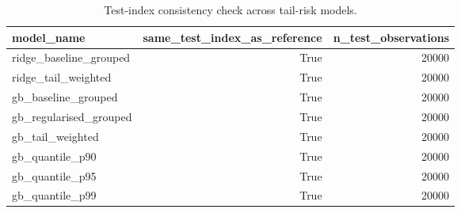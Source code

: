 \begin{table}
\caption{Test-index consistency check across tail-risk models.}
\label{tab:08-test-index-check}
\begin{tabular}{lrr}
\toprule
model_name & same_test_index_as_reference & n_test_observations \\
\midrule
ridge_baseline_grouped & True & 20000 \\
ridge_tail_weighted & True & 20000 \\
gb_baseline_grouped & True & 20000 \\
gb_regularised_grouped & True & 20000 \\
gb_tail_weighted & True & 20000 \\
gb_quantile_p90 & True & 20000 \\
gb_quantile_p95 & True & 20000 \\
gb_quantile_p99 & True & 20000 \\
\bottomrule
\end{tabular}
\end{table}

